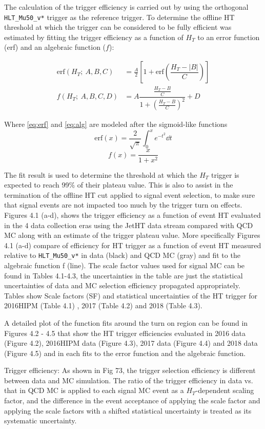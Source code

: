 The calculation of the trigger efficiency is carried out by using the orthogonal \verb|HLT_Mu50_v*| trigger as the reference trigger. To determine the offline HT threshold at which the trigger can be considered to be fully efficient was estimated by fitting the trigger efficiency as a function of $H_T$ to an error function (erf) and an algebraic function ($f$):

\begin{align}
 \text{erf}(H_T ;\ A,B,C)  &= \frac A2 \left[1+ \text{erf}\left(\dfrac{H_T - |B|}{C}\right) \right]\label{eq:erf}\\
 f(H_T ;\ A,B,C,D) &= A \dfrac{\frac{H_T - B}{C}}{1+ \left(\frac{H_T - B}{C}\right)^2} + D \label{eq:alg}
\end{align}

Where \eqref{eq:erf} and \eqref{eq:alg} are modeled after the sigmoid-like functions
\[
    \text{erf}(x) = \frac{2}{\sqrt{\pi}} \int_0^x e^{-t^2} \dd{t}
\]
\[
    f(x)=\frac{x}{1+x^{2}}
\]


The fit result is used to determine the threshold at which the $H_T$ trigger is expected to reach 99\% of their plateau value. This is also to assist in the termination of the offline HT cut applied to signal event selection, to make sure that signal events are not impacted too much by the trigger turn on effects. Figures 4.1 (a-d), shows the trigger efficiency as a function of event HT evaluated in the 4 data collection eras using the JetHT data stream compared with QCD MC along with an estimate of the trigger plateau value.
More specifically Figures 4.1 (a-d) compare of efficiency for HT trigger as a function of event HT measured relative to \verb|HLT_Mu50_v*| in data (black) and QCD MC (gray) and fit to the algebraic function f (line). The scale factor values used for signal MC can be found in Tables 4.1-4.3, the uncertainties in the table are just the statistical uncertainties of data and MC selection efficiency propagated appropriately. Tables show Scale factors (SF) and statistical uncertainties of the HT trigger for 2016HIPM (Table 4.1) , 2017  (Table 4.2) and 2018 (Table 4.3).

A detailed plot of the function fits around the turn on region can be found in Figures 4.2 - 4.5 that show the HT trigger efficiencies evaluated in 2016 data (Figure 4.2), 2016HIPM data (Figure 4.3), 2017 data (Figure 4.4)  and 2018 data  (Figure 4.5)  and in each fits to the error function and the algebraic function.



Trigger efficiency: As shown in Fig 73, the trigger selection efficiency is different between data
and MC simulation. The ratio of the trigger efficiency in data vs. that in QCD MC is applied
to each signal MC event as a $H_T$-dependent scaling factor, and the difference in the event acceptance of applying the scale factor and applying the scale factors with a shifted statistical
uncertainty is treated as its systematic uncertainty.
